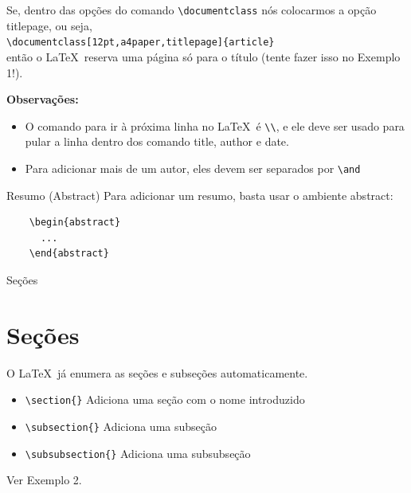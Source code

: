 \documentclass[12pt]{beamer}
\begin{document}
\begin{frame}[fragile]
  Se, dentro das opções do comando \verb+\documentclass+ nós colocarmos a opção titlepage, ou seja,\\
  \medskip
  \verb+\documentclass[12pt,a4paper,titlepage]{article}+\\
  \medskip
  então o \LaTeX\ reserva uma página só para o título (tente fazer isso no Exemplo 1!).
\end{frame}

\begin{frame}[fragile]
  \textbf{Observações:}\\
  \begin{itemize}
    \item O comando para ir à próxima linha no \LaTeX\ é \verb+\\+, e ele deve ser usado para pular a linha dentro dos comando title, author e date.
    \item Para adicionar mais de um autor, eles devem ser separados por \verb+\and+
  \end{itemize}
\end{frame}

\begin{frame}[fragile]{Resumo (Abstract)}
  Para adicionar um resumo, basta usar o ambiente abstract:
  \begin{verbatim}
    \begin{abstract}
      ...
    \end{abstract}
  \end{verbatim}
\end{frame}

\begin{frame}[fragile]{Seções}
  \section{Seções}
  O \LaTeX\ já enumera as seções e subseções automaticamente.
  \begin{itemize}
    \item \verb+\section{}+ Adiciona uma seção com o nome introduzido
    \item \verb+\subsection{}+ Adiciona uma subseção
    \item \verb+\subsubsection{}+ Adiciona uma subsubseção
  \end{itemize}
  \bigskip
  Ver Exemplo 2.
\end{frame}
\end{document}
